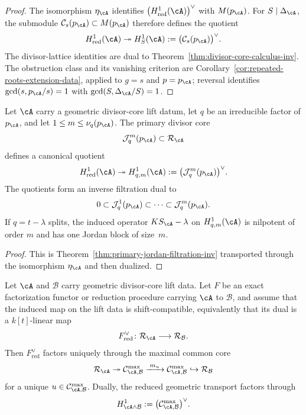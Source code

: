 \begin{proof}
The isomorphism $\eta_\cA$ identifies
$\bigl(H^1_{\mathrm{red}}(\cA)\bigr)^\vee$ with $M(p_\cA)$.
For $S\mid \Delta_\cA$, the submodule
$\mathcal C_s(p_\cA)\subset M(p_\cA)$ therefore defines the quotient
\[
H^1_{\mathrm{red}}(\cA)\twoheadrightarrow
H^1_S(\cA):=\bigl(\mathcal C_s(p_\cA)\bigr)^\vee.
\]
The divisor-lattice identities are dual to
Theorem~\ref{thm:divisor-core-calculus-inv}. The obstruction class
and its vanishing criterion are
Corollary~\ref{cor:repeated-roots-extension-data}, applied to
$g=s$ and $p=p_\cA$; reversal identifies
$\gcd(s,p_\cA/s)=1$ with
$\gcd(S,\Delta_\cA/S)=1$.
\end{proof}

\begin{proposition}
\label{prop:primary-quotient-filtration-lift-inv}
Let $\cA$ carry a geometric divisor-core lift datum, let $q$ be an
irreducible factor of $p_\cA$, and let
$1\leq m\leq \nu_q(p_\cA)$. The primary divisor core
\[
\mathcal J_q^m(p_\cA)\subset \mathcal R_\cA
\]
defines a canonical quotient
\[
H^1_{\mathrm{red}}(\cA)\twoheadrightarrow
H^1_{q,m}(\cA):=
\bigl(\mathcal J_q^m(p_\cA)\bigr)^\vee.
\]
The quotients form an inverse filtration dual to
\[
0\subset
\mathcal J_q^1(p_\cA)\subset
\cdots\subset
\mathcal J_q^m(p_\cA).
\]
If $q=t-\lambda$ splits, the induced operator $KS_\cA-\lambda$ on
$H^1_{q,m}(\cA)$ is nilpotent of order $m$ and has one Jordan block
of size~$m$.
\end{proposition}

\begin{proof}
This is Theorem~\ref{thm:primary-jordan-filtration-inv} transported
through the isomorphism $\eta_\cA$ and then dualized.
\end{proof}

\begin{theorem}
\label{thm:geometric-common-core-factorization-inv}
Let $\cA$ and $\mathcal B$ carry geometric divisor-core lift data.
Let $F$ be an exact factorization functor or reduction procedure
carrying $\cA$ to $\mathcal B$, and assume that the induced map on
the lift data is shift-compatible, equivalently that its dual is a
$k[t]$-linear map
\[
F^\vee_{\mathrm{red}}\colon
\mathcal R_\cA\longrightarrow \mathcal R_\mathcal B.
\]
Then $F^\vee_{\mathrm{red}}$ factors uniquely through the maximal
common core
\[
\mathcal R_\cA
\twoheadrightarrow
\mathcal C^{\max}_{\cA,\mathcal B}
\xrightarrow{\;m_u\;}
\mathcal C^{\max}_{\cA,\mathcal B}
\hookrightarrow
\mathcal R_\mathcal B
\]
for a unique $u\in\mathcal C^{\max}_{\cA,\mathcal B}$. Dually, the
reduced geometric transport factors through
\[
H^1_{\cA\wedge\mathcal B}:=
\bigl(\mathcal C^{\max}_{\cA,\mathcal B}\bigr)^\vee.
\]
\end{theorem}

